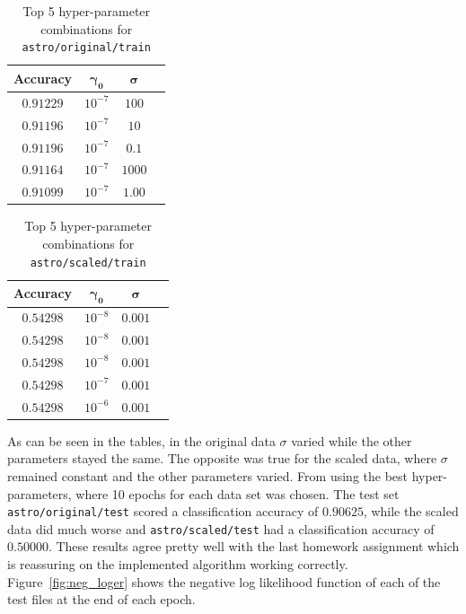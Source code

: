 \begin{enumerate}
\begin{itemize}
\begin{table}[!h]
\centering
\begin{tabular}{c c c c}
\hline\hline
{\bf Accuracy} & $\boldsymbol{\gamma_{0}}$ &  $\boldsymbol{\sigma}$\\
\hline
$0.91229$ & $10^{-7}$ &  $100$\\
$0.91196$ & $10^{-7}$ &  $10$\\
$0.91196$ & $10^{-7}$ &  $0.1$\\
$0.91164$ & $10^{-7}$ &  $1000$\\
$0.91099$ & $10^{-7}$ &  $1.00$\\
\hline
\end{tabular}
\caption{Top 5 hyper-parameter combinations for {\tt astro/original/train}}
\label{table:acc_orig}
\end{table}

\begin{table}[!h]
\centering
\begin{tabular}{c c c c}
\hline\hline
{\bf Accuracy} & $\boldsymbol{\gamma_{0}}$ & $\boldsymbol{\sigma}$\\
\hline
$0.54298$ & $10^{-8}$ &  $0.001$\\
$0.54298$ & $10^{-8}$ &  $0.001$\\
$0.54298$ & $10^{-8}$ &  $0.001$\\
$0.54298$ & $10^{-7}$ &  $0.001$\\
$0.54298$ & $10^{-6}$ &  $0.001$\\
\hline
\end{tabular}
\caption{Top 5 hyper-parameter combinations for {\tt astro/scaled/train}}
\label{table:acc_scaled}
\end{table}


As can be seen in the tables, in the original data $\sigma$ varied while the other parameters stayed the same. The opposite was true for the scaled data, where $\sigma$ remained constant and the other parameters varied. From using the best hyper-parameters, where 10 epochs for each data set was chosen. The test set \verb~astro/original/test~ scored a classification accuracy of $0.90625$, while the scaled data did much worse and \verb~astro/scaled/test~ had a classification accuracy of $0.50000$. These results agree pretty well with the last homework assignment which is reassuring on the implemented algorithm working correctly. Figure~\ref{fig:neg_loger} shows the negative log likelihood function of each of the test files at the end of each epoch.


\end{itemize}
\end{enumerate}
